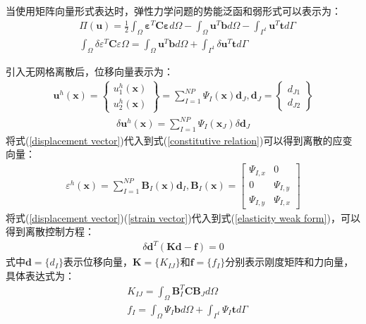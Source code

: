 \documentclass[a4paper]{ctexbook}
\begin{document}
当使用矩阵向量形式表达时，弹性力学问题的势能泛函和弱形式可以表示为：
\begin{align}\label{elasticity weak form}
    &\Pi(\pmb{u})=\frac{1}{2}\int_{\Omega}\pmb{\varepsilon}^T\pmb{C}\pmb{\varepsilon}d\Omega-\int_{\Omega}\pmb{u}^T\pmb{b}d\Omega-\int_{\Gamma^t}\pmb{u}^T\pmb{t}d\Gamma\\
    &\int_{\Omega}\delta\varepsilon^T\pmb{C}\varepsilon\Omega=\int_{\Omega}\pmb{u}^T\pmb{b}d\Omega+\int_{\Gamma^t}\delta\pmb{u}^T\pmb{t}d\Gamma
\end{align}\par
引入无网格离散后，位移向量表示为：
\begin{equation}\label{displacement vector}
\begin{split}
    \pmb{u}^h(\pmb{x})=\left\{\begin{matrix}u_1^h(\pmb{x})\\u_2^h(\pmb{x})
    \end{matrix}\right\}=\sum_{I=1}^{N\!P}\Psi_I(\pmb{x})\pmb d_J,\pmb{d}_J=\left\{\begin{matrix}d_{J1}\\d_{J2}\end{matrix}\right\}
\end{split}
\end{equation}
\begin{equation}
\begin{split}
    \delta\pmb{u}^h(\pmb{x})=\sum_{I=1}^{N\!P}\Psi_I(\pmb{x}_J)\delta\pmb{d}_J
\end{split}
\end{equation}
将式(\ref{displacement vector})代入到式(\ref{constitutive relation})可以得到离散的应变向量：
\begin{equation}\label{strain vector}
\begin{split}
    \varepsilon^h(\pmb{x})=\sum_{I=1}^{N\!P}\pmb{B}_I(\pmb{x})\pmb{d}_I,\pmb{B}_I(\pmb{x})= \left[\begin{matrix}\Psi_{I,x}&0\\0&\Psi_{I,y}\\\Psi_{I,y}&\Psi_{I,x} \end{matrix}\right] 
\end{split}
\end{equation}
将式(\ref{displacement vector})(\ref{strain vector})代入到式(\ref{elasticity weak form})，可以得到离散控制方程：
\begin{equation}
\begin{split}
    \delta\pmb{d}^T(\pmb{K}\pmb{d}-\pmb{f})=0
\end{split}
\end{equation}
式中$\pmb{d}=\{d_I\}$表示位移向量，$\pmb{K}=\{K_{IJ}\}$和$\pmb{f}=\{f_I\}$分别表示刚度矩阵和力向量，具体表达式为：
\begin{equation}
\begin{split}
        &K_{IJ}=\int_{\Omega}\pmb{B}_I^T\pmb{C}\pmb{B}_Jd\Omega\\
        &f_I=\int_{\Omega}\Psi_I\pmb{b}d\Omega+\int_{\Gamma^t}\Psi_I\pmb{t}d\Gamma
\end{split}
\end{equation}
\end{document}
